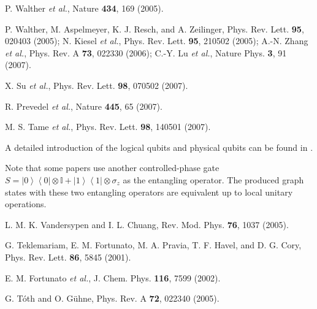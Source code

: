 \documentclass[showpacs,superscriptaddress,twocolumn,prl]{revtex4}
\begin{document}
\begin{thebibliography}{99}
 P. Walther \textit{et al.}, Nature \textbf{434}, 169
(2005).

 P. Walther, M. Aspelmeyer, K. J. Resch, and A. Zeilinger,
Phys. Rev. Lett. \textbf{95}, 020403 (2005); N. Kiesel \textit{et al.},
Phys. Rev. Lett. \textbf{95}, 210502 (2005); A.-N. Zhang \textit{et al.},
Phys. Rev. A \textbf{73}, 022330 (2006); C.-Y. Lu \textit{et al.}, Nature
Phys. \textbf{3}, 91 (2007).

 X. Su \textit{et al.}, Phys. Rev. Lett. \textbf{98}, 070502
(2007).

 R. Prevedel \textit{et al.}, Nature \textbf{445}, 65
(2007).

 M. S. Tame \textit{et al.}, Phys. Rev. Lett. \textbf{98},
140501 (2007).

 A detailed introduction of the logical qubits and
physical qubits can be found in \cite{eworkn1}.

 Note that some papers use another controlled-phase gate $%
S=\left\vert 0\right\rangle \left\langle 0\right\vert \otimes \mathbb{I}%
+\left\vert 1\right\rangle \left\langle 1\right\vert \otimes \sigma _{z}$ as
the entangling operator. The produced graph states with these two entangling
operators are equivalent up to local unitary operations.

 L. M. K. Vandersypen and I. L. Chuang, Rev. Mod. Phys.
\textbf{76}, 1037 (2005).

 G. Teklemariam, E. M. Fortunato, M. A. Pravia, T. F.
Havel, and D. G. Cory, Phys. Rev. Lett. \textbf{86}, 5845 (2001).

 E. M. Fortunato \textit{et al.}, J. Chem. Phys. \textbf{116},
7599 (2002).

 G. T\'{o}th and O. G\"{u}hne, Phys. Rev. A \textbf{72},
022340 (2005).
\end{thebibliography}
\end{document}
